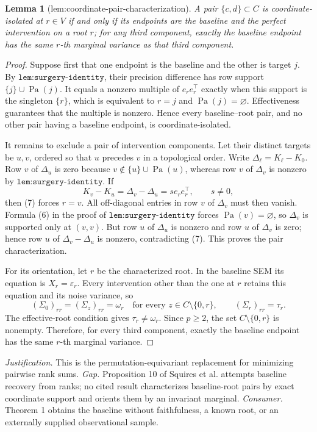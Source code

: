 \documentclass{article}
\newtheorem{lemma}{Lemma}
\begin{document}
\begin{lemma}[lem:coordinate-pair-characterization]\label{lem:coordinate-pair-characterization}
A pair \(\{c,d\}\subset C\) is coordinate-isolated at \(r\in V\) if and only if its endpoints are the baseline and the perfect intervention on a root \(r\); for any third component, exactly the baseline endpoint has the same \(r\)-th marginal variance as that third component.
\end{lemma}
\begin{proof}
Suppose first that one endpoint is the baseline and the other is target
\(j\).  By \(\texttt{lem:surgery-identity}\), their precision difference
has row support \(\{j\}\cup\operatorname{Pa}(j)\).  It equals a nonzero
multiple of \(e_re_r^{\top}\) exactly when this support is the singleton
\(\{r\}\), which is equivalent to \(r=j\) and
\(\operatorname{Pa}(j)=\varnothing\).  Effectiveness guarantees that the
multiple is nonzero.  Hence every baseline--root pair, and no other pair
having a baseline endpoint, is coordinate-isolated.

It remains to exclude a pair of intervention components.  Let their
distinct targets be \(u,v\), ordered so that \(u\) precedes \(v\) in a
topological order.  Write \(\Delta_\ell=K_\ell-K_0\).  Row \(v\) of
\(\Delta_u\) is zero because \(v\notin\{u\}\cup\operatorname{Pa}(u)\),
whereas row \(v\) of \(\Delta_v\) is nonzero by
\(\texttt{lem:surgery-identity}\).  If
\[
 K_v-K_u=\Delta_v-\Delta_u=s e_re_r^{\top},\qquad s\neq0,            \tag{7}
\]
then (7) forces \(r=v\).  All off-diagonal entries in row \(v\) of
\(\Delta_v\) must then vanish.  Formula (6) in the proof of
\(\texttt{lem:surgery-identity}\) forces
\(\operatorname{Pa}(v)=\varnothing\), so \(\Delta_v\) is supported only
at \((v,v)\).  But row \(u\) of \(\Delta_u\) is nonzero and row \(u\) of
\(\Delta_v\) is zero; hence row \(u\) of \(\Delta_v-\Delta_u\) is
nonzero, contradicting (7).  This proves the pair characterization.

For its orientation, let \(r\) be the characterized root.  In the
baseline SEM its equation is \(X_r=\varepsilon_r\).  Every intervention
other than the one at \(r\) retains this equation and its noise variance,
so
\[
 (\Sigma_0)_{rr}=(\Sigma_z)_{rr}=\omega_r
 \quad\text{for every }z\in C\setminus\{0,r\},
 \qquad
 (\Sigma_r)_{rr}=\tau_r.
\]
The effective-root condition gives \(\tau_r\neq\omega_r\).  Since
\(p\ge2\), the set \(C\setminus\{0,r\}\) is nonempty.  Therefore, for
every third component, exactly the baseline endpoint has the same
\(r\)-th marginal variance.
\end{proof}
\par\smallskip\noindent \textit{Justification.} This is the permutation-equivariant replacement for minimizing pairwise rank sums. \textit{Gap.} Proposition 10 of Squires et al. attempts baseline recovery from ranks; no cited result characterizes baseline-root pairs by exact coordinate support and orients them by an invariant marginal. \textit{Consumer.} Theorem 1 obtains the baseline without faithfulness, a known root, or an externally supplied observational sample.
\end{document}

